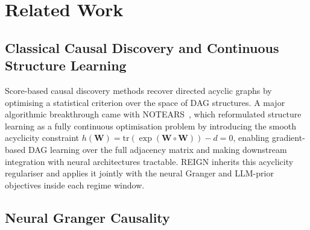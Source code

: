 
\section{Related Work}
\label{sec:related}

\subsection{Classical Causal Discovery and Continuous Structure Learning}

Score-based causal discovery methods recover directed acyclic graphs
by optimising a statistical criterion over the space of DAG structures.
A major algorithmic breakthrough came with NOTEARS~\cite{Zheng2018},
which reformulated structure learning as a fully continuous optimisation
problem by introducing the smooth acyclicity constraint
$h(\mathbf{W}) = \mathrm{tr}(\exp(\mathbf{W} \circ \mathbf{W})) - d = 0$,
enabling gradient-based DAG learning over the full adjacency matrix and
making downstream integration with neural architectures tractable.
REIGN inherits this acyclicity regulariser and applies it jointly with
the neural Granger and LLM-prior objectives inside each regime window.

\subsection{Neural Granger Causality}

